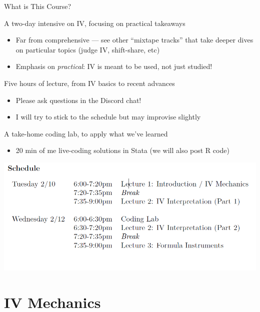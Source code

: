 \documentclass{beamer}
\begin{document}
\begin{frame}{What is This Course?}

A two-day intensive on IV, focusing on practical takeaways \pause

\begin{itemize}
  \item Far from comprehensive --- see other ``mixtape tracks'' that take deeper dives on particular topics (judge IV, shift-share, etc)
  \item Emphasis on \emph{practical}: IV is meant to be used, not just studied!
\end{itemize}\pause\medskip

Five hours of lecture, from IV basics to recent advances

\begin{itemize}
  \item Please ask questions in the Discord chat!
  \item I will try to stick to the schedule but may improvise slightly
\end{itemize}\pause\medskip

A take-home coding lab, to apply what we've learned
\begin{itemize}
  \item 20 min of me live-coding solutions in Stata (we will also post R code)
\end{itemize}

\end{frame}

\begin{frame}
\includegraphics[scale=0.65]{./lecture_includes/schedule.png}
\end{frame}

\section{IV Mechanics}
\end{document}
